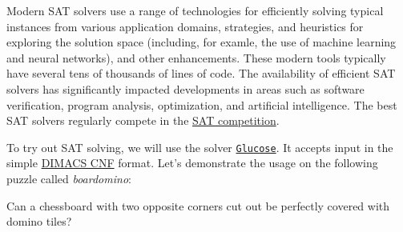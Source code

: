 Modern SAT solvers use a range of technologies for efficiently solving typical instances from various application domains, strategies, and heuristics for exploring the solution space (including, for examle, the use of machine learning and neural networks), and other enhancements. These modern tools typically have several tens of thousands of lines of code. The availability of efficient SAT solvers has significantly impacted developments in areas such as software verification, program analysis, optimization, and artificial intelligence. The best SAT solvers regularly compete in the \href{http://www.satcompetition.org}{SAT competition}.

To try out SAT solving, we will use the solver \href{https://github.com/mi-ki/glucose-syrup}{\texttt{Glucose}}. It accepts input in the simple \href{http://people.sc.fsu.edu/~jburkardt/data/cnf/cnf.html}{DIMACS CNF} format. Let's demonstrate the usage on the following puzzle called \emph{boardomino}:

\begin{example}[Boardomino]
Can a chessboard with two opposite corners cut out be perfectly covered with domino tiles?    
\end{example}

